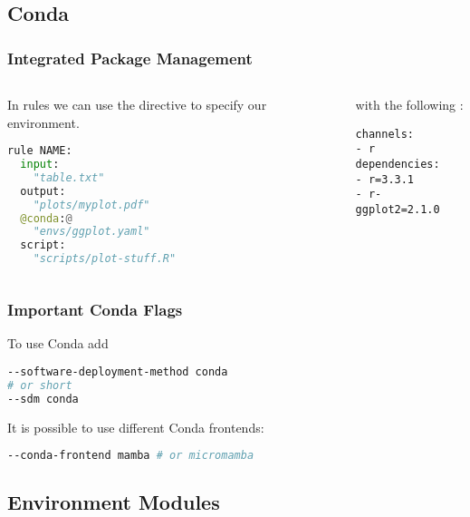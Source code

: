 \subsection{Conda}

\begin{frame}[fragile]
  \frametitle{Integrated Package Management}
  \begin{columns}
  	\begin{column}{0.5\textwidth}
  	  In rules we can use the  directive to specify our environment.
  	  \begin{lstlisting}[language=Python,style=Python,basicstyle=\footnotesize]
rule NAME:
  input:
  	"table.txt"
  output:
  	"plots/myplot.pdf"
  @conda:@
  	"envs/ggplot.yaml"
  script:
  	"scripts/plot-stuff.R"
  	  \end{lstlisting}
  	\end{column}
    \begin{column}{0.5\textwidth}
       with the following :
       \begin{lstlisting}[style=Plain]
channels:
- r
dependencies:
- r=3.3.1
- r-ggplot2=2.1.0
      \end{lstlisting}   
    \end{column}
  \end{columns}	
\end{frame}

\begin{frame}[fragile]
  \frametitle{Important Conda Flags}
  To use Conda add
  \begin{lstlisting}[language=Bash, style=Shell]
--software-deployment-method conda 
# or short
--sdm conda
  \end{lstlisting}
  \pause
  It is possible to use different Conda frontends:
  \begin{lstlisting}[language=Bash, style=Shell]
--conda-frontend mamba # or micromamba
  \end{lstlisting}
\end{frame}

\subsection{Environment Modules}

